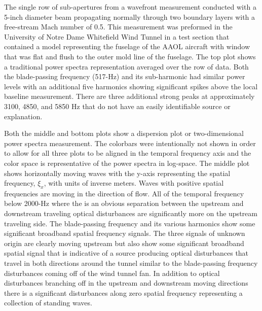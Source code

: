 The single row of sub-apertures from a wavefront measurement conducted with a 5-inch diameter beam propagating normally through two boundary layers with a free-stream Mach number of 0.5.
This measurement was preformed in the University of Notre Dame Whitefield Wind Tunnel in a test section that contained a model representing the fuselage of the AAOL aircraft \cite{Jumper-2013-8KtN3pue} with window that was flat and flush to the outer mold line of the fuselage.
The top plot shows a traditional power spectra representation averaged over the row of data.
Both the blade-passing frequency (517-Hz) and its sub-harmonic had similar power levels with an additional five harmonics showing significant spikes above the local baseline measurement.
There are three additional strong peaks at approximately 3100, 4850, and 5850 Hz that do not have an easily identifiable source or explanation.

Both the middle and bottom plots show a dispersion plot or two-dimensional power spectra measurement.
The colorbars were intentionally not shown in order to allow for all three plots to be aligned in the temporal frequency axis and the color space is representative of the power spectra in log-space.
The middle plot shows horizontally moving waves with the y-axis representing the spatial frequency, $\xi_x$, with units of inverse meters.
Waves with positive spatial frequencies are moving in the direction of flow.
All of the temporal frequency below 2000-Hz where the is an obvious separation between the upstream and downstream traveling optical disturbances are significantly more on the upstream traveling side.
The blade-passing frequency and its various harmonics show some significant broadband spatial frequency signals.
The three signals of unknown origin are clearly moving upstream but also show some significant broadband spatial signal that is indicative of a source producing optical disturbances that travel in both directions around the tunnel similar to the blade-passing frequency disturbances coming off of the wind tunnel fan.
In addition to optical disturbances branching off in the upstream and downstream moving directions there is a significant disturbances along zero spatial frequency representing a collection of standing waves.

